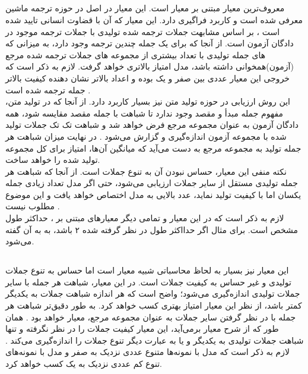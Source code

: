 \subsection{\bleu{}}
معروف‌ترین معیار مبتنی بر \ngramphrase{} معیار \bleu{} است. این معیار در اصل در حوزه ترجمه ماشین معرفی شده است و کاربرد فراگیری دارد. این معیار که
آن با قضاوت انسانی تایید شده است \cite{bleu}، بر اساس مشابهت \ngramphrase{} جملات ترجمه شده تولیدی با جملات ترجمه موجود در دادگان آزمون است. از آنجا که برای یک جمله چندین ترجمه وجود دارد، به میزانی که \ngramphrase{}‌های جمله تولیدی با تعداد بیشتری از مجموعه \ngram{}‌های جملات ترجمه شده مرجع (آزمون)‌همخوانی داشته باشد، مدل امتیاز بالا‌تری خواهد گرفت. لازم به ذکر است که خروجی این معیار عددی بین صفر و یک بوده و اعداد بالاتر نشان دهنده کیفیت بالاتر جمله ترجمه شده است \cite{bleu}.
\\
این روش ارزیابی در حوزه تولید متن نیز بسیار کاربرد دارد. از آنجا که در تولید متن، مفهوم جمله مبدأ و مقصد وجود ندارد تا شباهت با جمله مقصد مقایسه شود، همه دادگان آزمون به عنوان مجموعه مرجع فرض خواهد شد و شباهت تک تک جملات تولید شده با مجموعه آزمون اندازه‌گیری و گزارش می‌شود \cite{seqgan}. در نهایت میزان شباهت هر جمله تولید به مجموعه مرجع به دست می‌آید که میانگین آن‌ها، امتیاز \bleu{} برای کل مجموعه تولید شده را خواهد ساخت.
\\
نکته منفی این معیار، حساس نبودن آن به تنوع جملات است. از آنجا که شباهت هر جمله تولیدی مستقل از سایر جملات ارزیابی می‌شود، حتی اگر مدل تعداد زیادی جمله یکسان اما با کیفیت تولید نماید، عدد بالایی به مدل اختصاص خواهد یافت و این موضوع مطلوب نیست \cite{jointly}.
\\
لازم به ذکر است که در این معیار و تمامی دیگر معیارهای مبتنی بر \ngramphrase{}، حداکثر طول \ngramphrase{} مشخص است. برای مثال اگر حدااکثر طول \ngramphrase{} در نظر گرفته شده ۲ باشد، به به آن \bleu[-2]{} گفته می‌شود.
\subsection{\selfbleu{}}
این معیار نیز بسیار به لحاظ محاسباتی شبیه معیار \bleu{} است اما حساس به تنوع جملات تولیدی و غیر حساس به کیفیت جملات است. در این معیار، شباهت هر جمله با سایر جملات تولیدی اندازه‌گیری می‌شود؛ واضح است که هر اندازه شباهت جملات به یکدیگر کمتر باشد، از نظر این معیار امتیاز بهتری کسب خواهد کرد. به طور دقیق‌تر شباهت \bleu{} هر جمله با در نظر گرفتن سایر جملات به عنوان مجموعه مرجع، معیار \selfbleu{} خواهد بود \cite{seqgan}. همان طور که از شرح معیار بر‌می‌آید، این معیار کیفیت جملات را در نظر نگرفته و تنها شباهت جملات تولیدی به یکدیگر و یا به عبارت دیگر تنوع جملات را اندازه‌گیری می‌کند \cite{jointly}. لازم به ذکر است که مدل با نمونه‌ها متنوع عددی نزدیک به صفر و مدل با نمونه‌های تنوع کم عددی نزدیک به یک کسب خواهد کرد.
